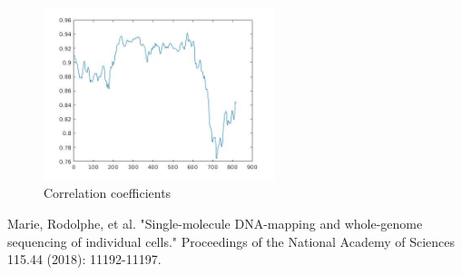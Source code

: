 \documentclass{article}
\begin{document}
\begin{figure}
\includegraphics[width=0.6\textwidth]{maxcoef.jpg}
\caption{Correlation coefficients}
\end{figure}


\begin{thebibliography}{10}
\bibitem Marie, Rodolphe, et al. "Single-molecule DNA-mapping and whole-genome sequencing of individual cells." Proceedings of the National Academy of Sciences 115.44 (2018): 11192-11197.
\end{thebibliography}
\end{document}
